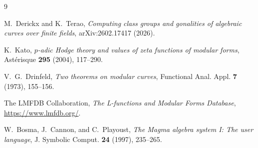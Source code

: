 \documentclass[11pt]{article}
\begin{document}
\begin{thebibliography}{9}

M.~Derickx and K.~Terao,
\emph{Computing class groups and gonalities of algebraic curves over
finite fields}, arXiv:2602.17417 (2026).

K.~Kato,
\emph{\(p\)-adic Hodge theory and values of zeta functions of modular
forms}, Astérisque \textbf{295} (2004), 117--290.

V.~G.~Drinfeld,
\emph{Two theorems on modular curves},
Functional Anal. Appl. \textbf{7} (1973), 155--156.

The LMFDB Collaboration,
\emph{The L-functions and Modular Forms Database},
\url{https://www.lmfdb.org/}.

W.~Bosma, J.~Cannon, and C.~Playoust,
\emph{The Magma algebra system I: The user language},
J. Symbolic Comput. \textbf{24} (1997), 235--265.

\end{thebibliography}
\end{document}

